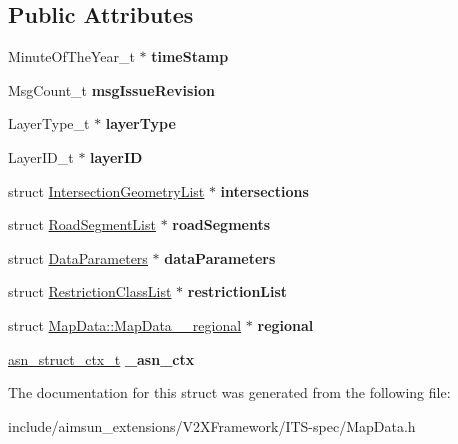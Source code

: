 \subsection*{Public Attributes}
\begin{DoxyCompactItemize}
\item 
Minute\+Of\+The\+Year\+\_\+t $\ast$ {\bfseries time\+Stamp}\hypertarget{structMapData_ae40c64ddada1120805f8618d977a63e8}{}\label{structMapData_ae40c64ddada1120805f8618d977a63e8}

\item 
Msg\+Count\+\_\+t {\bfseries msg\+Issue\+Revision}\hypertarget{structMapData_aa9385d82c9a628048a6ae3d74f49897d}{}\label{structMapData_aa9385d82c9a628048a6ae3d74f49897d}

\item 
Layer\+Type\+\_\+t $\ast$ {\bfseries layer\+Type}\hypertarget{structMapData_a5f8e8f5b2d6d6028e0ef87a46f252bcf}{}\label{structMapData_a5f8e8f5b2d6d6028e0ef87a46f252bcf}

\item 
Layer\+I\+D\+\_\+t $\ast$ {\bfseries layer\+ID}\hypertarget{structMapData_a4d871d3e039664f62aa076bf74982d5a}{}\label{structMapData_a4d871d3e039664f62aa076bf74982d5a}

\item 
struct \hyperlink{structIntersectionGeometryList}{Intersection\+Geometry\+List} $\ast$ {\bfseries intersections}\hypertarget{structMapData_a5477953521ec385c11bfa74aad5ac8df}{}\label{structMapData_a5477953521ec385c11bfa74aad5ac8df}

\item 
struct \hyperlink{structRoadSegmentList}{Road\+Segment\+List} $\ast$ {\bfseries road\+Segments}\hypertarget{structMapData_a4e6a3c0eedf13cfca0b04adc2b101b5c}{}\label{structMapData_a4e6a3c0eedf13cfca0b04adc2b101b5c}

\item 
struct \hyperlink{structDataParameters}{Data\+Parameters} $\ast$ {\bfseries data\+Parameters}\hypertarget{structMapData_ab8da8803b0277e20af49b6a35bd5e646}{}\label{structMapData_ab8da8803b0277e20af49b6a35bd5e646}

\item 
struct \hyperlink{structRestrictionClassList}{Restriction\+Class\+List} $\ast$ {\bfseries restriction\+List}\hypertarget{structMapData_a7079e1096f3e9377dd284801bb05a142}{}\label{structMapData_a7079e1096f3e9377dd284801bb05a142}

\item 
struct \hyperlink{structMapData_1_1MapData____regional}{Map\+Data\+::\+Map\+Data\+\_\+\+\_\+regional} $\ast$ {\bfseries regional}\hypertarget{structMapData_a93c991235c2d3c691ef381c6b0a23cd3}{}\label{structMapData_a93c991235c2d3c691ef381c6b0a23cd3}

\item 
\hyperlink{structasn__struct__ctx__s}{asn\+\_\+struct\+\_\+ctx\+\_\+t} {\bfseries \+\_\+asn\+\_\+ctx}\hypertarget{structMapData_ac191e552cfda373d23e7bd6fe079a6a0}{}\label{structMapData_ac191e552cfda373d23e7bd6fe079a6a0}

\end{DoxyCompactItemize}


The documentation for this struct was generated from the following file\+:\begin{DoxyCompactItemize}
\item 
include/aimsun\+\_\+extensions/\+V2\+X\+Framework/\+I\+T\+S-\/spec/Map\+Data.\+h\end{DoxyCompactItemize}
